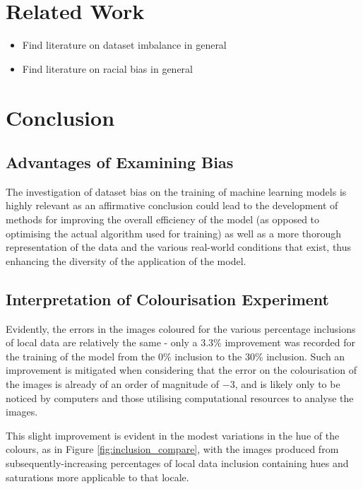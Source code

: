 \documentclass[conference]{IEEEtran}
\begin{document}
\section{Related Work}

\begin{itemize}
    \item Find literature on dataset imbalance in general
    \item Find literature on racial bias in general
\end{itemize}

\section{Conclusion}

%
%
%
\subsection{Advantages of Examining Bias}

The investigation of dataset bias on the training of machine learning models is highly relevant as an affirmative conclusion could lead to the development of methods for improving the overall efficiency of the model (as opposed to optimising the actual algorithm used for training) as well as a more thorough representation of the data and the various real-world conditions that exist, thus enhancing the diversity of the application of the model.

\subsection{Interpretation of Colourisation Experiment}

Evidently, the errors in the images coloured for the various percentage inclusions of local data are relatively the same - only a 3.3\% improvement was recorded for the training of the model from the 0\% inclusion to the 30\% inclusion. Such an improvement is mitigated when considering that the error on the colourisation of the images is already of an order of magnitude of $-3$, and is likely only to be noticed by computers and those utilising computational resources to analyse the images.

This slight improvement is evident in the modest variations in the hue of the colours, as in Figure \ref{fig:inclusion_compare}, with the images produced from subsequently-increasing percentages of local data inclusion containing hues and saturations more applicable to that locale.
\end{document}
